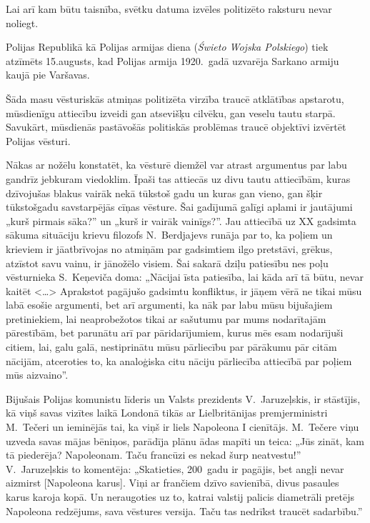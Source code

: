 \documentclass[twoside,a5paper,12pt,fleqn,openany]{extbook}
\newcommand{\pltxti}[1]{\textit{\textpolish{#1}}}
\newcommand{\citespace}{<\dots{}>}
\begin{document}
Lai arī kam būtu taisnība, svētku datuma izvēles politizēto raksturu nevar noliegt.

Polijas Republikā kā Polijas armijas diena (\pltxti{Świeto Wojska Polskiego}) tiek atzīmēts 15.augusts, kad Polijas armija 1920.~gadā uzvarēja Sarkano armiju kaujā pie Varšavas.

Šāda masu vēsturiskās atmiņas politizēta virzība traucē atklātības apstarotu, mūsdienīgu attiecību izveidi gan atsevišķu cilvēku, gan veselu tautu starpā. Savukārt, mūsdienās pastāvošās politiskās problēmas traucē objektīvi izvērtēt Polijas vēsturi.

Nākas ar nožēlu konstatēt, ka vēsturē diemžēl var atrast argumentus par labu gandrīz jebkuram viedoklim. Īpaši tas attiecās uz divu tautu attiecībām, kuras dzīvojušas blakus vairāk nekā tūkstoš gadu un kuras gan vieno, gan šķir tūkstošgadu savstarpējās cīņas vēsture. Šai gadījumā galīgi aplami ir jautājumi „kurš pirmais sāka?” un „kurš ir vairāk vainīgs?”. Jau attiecībā uz XX gadsimta sākuma situāciju krievu filozofs N.~Berdjajevs runāja par to, ka poļiem un krieviem ir jāatbrīvojas no atmiņām par gadsimtiem ilgo pretstāvi, grēkus, atzīstot savu vainu, ir jānožēlo visiem. Šai sakarā dziļu patiesību nes poļu vēsturnieka S.~Keņeviča doma: „Nācijai īsta patiesība, lai kāda arī tā būtu, nevar kaitēt \citespace{} Aprakstot pagājušo gadsimtu konfliktus, ir jāņem vērā ne tikai mūsu labā esošie argumenti, bet arī argumenti, ka nāk par labu mūsu bijušajiem pretiniekiem, lai neaprobežotos tikai ar sašutumu par mums nodarītajām pārestībām, bet parunātu arī par pāridarījumiem, kurus mēs esam nodarījuši citiem, lai, galu galā, nestiprinātu mūsu pārliecību par pārākumu pār citām nācijām, atceroties to, ka analoģiska citu nāciju pārliecība attiecībā par poļiem mūs aizvaino”.

Bijušais Polijas komunistu līderis un Valsts prezidents V.~Jaruzeļskis, ir stāstījis, kā viņš savas vizītes laikā Londonā tikās ar Lielbritānijas premjerministri M.~Tečeri un ieminējās tai, ka viņš ir liels Napoleona I cienītājs. M.~Tečere viņu uzveda savas mājas bēniņos, parādīja plānu ādas mapīti un teica: „Jūs zināt, kam tā piederēja? Napoleonam. Taču francūzi es nekad šurp neatvestu!” V.~Jaruzeļskis to komentēja: „Skatieties, 200~gadu ir pagājis, bet angļi nevar aizmirst [Napoleona karus]. Viņi ar frančiem dzīvo savienībā, divus pasaules karus karoja kopā. Un neraugoties uz to, katrai valstij palicis diametrāli pretējs Napoleona redzējums, sava vēstures versija. Taču tas nedrīkst traucēt sadarbību.”
\end{document}
